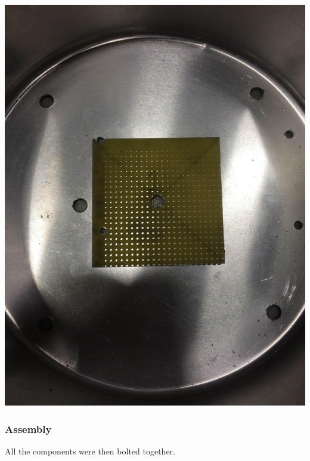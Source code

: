\documentclass[11pt]{article} %
\begin{document}
\begin{center}
\includegraphics[scale=0.08]{feed/16.jpeg}
\end{center}


\subsubsection{Assembly}
All the components were then bolted together. 
\end{document}
